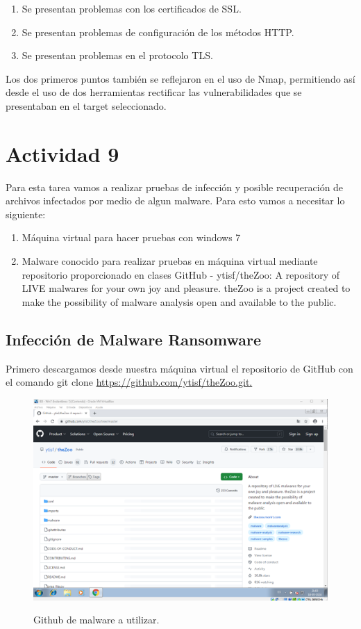 \documentclass[stu, 11pt, letterpaper, donotrepeattitle, floatsintext, natbib]{apa7}
\begin{document}
\begin{enumerate}
  \item Se presentan problemas con los certificados de SSL.
  \item  Se presentan problemas de configuración de los métodos HTTP.
  \item  Se presentan problemas en el protocolo TLS.
\end{enumerate}

Los dos primeros puntos también se reflejaron en el uso de Nmap, permitiendo así desde el uso de dos herramientas rectificar las vulnerabilidades que se presentaban en el target seleccionado.

\newpage

\section{\large Actividad 9}

Para esta tarea vamos a realizar pruebas de infección y posible recuperación de archivos infectados por medio de algun malware. Para esto vamos a necesitar lo siguiente:

\begin{enumerate}
  \item  Máquina virtual para hacer pruebas con windows 7  
  \item  Malware conocido para realizar pruebas en máquina virtual mediante repositorio proporcionado en clases GitHub - ytisf/theZoo: A repository of LIVE malwares for your own joy and pleasure. theZoo is a project created to make the possibility of malware analysis open and available to the public.
\end{enumerate}

\subsection{Infección de Malware Ransomware} 

Primero descargamos desde nuestra máquina virtual el repositorio de GitHub con el comando git clone \url{https://github.com/ytisf/theZoo.git.}

\begin{figure}[H]
    \centering
    \caption{Github de malware a utilizar.}
    \includegraphics[width=0.75\linewidth]{ram1.png} %
    \label{fig:OverallEffect}
\end{figure}
\end{document}
